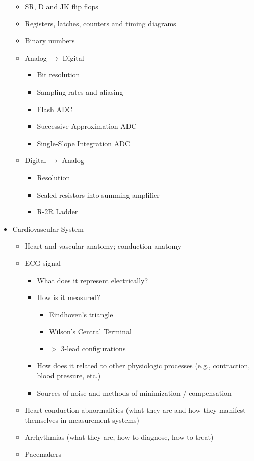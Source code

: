 \documentclass[10pt]{report}
\begin{document}
\begin{itemize}
\begin{itemize}
    \item SR, D and JK flip flops
    \item Registers, latches, counters and timing diagrams
    \item Binary numbers
    \item Analog $\rightarrow$ Digital
    \begin{itemize}
        \item Bit resolution
        \item Sampling rates and aliasing
        \item Flash ADC
        \item Successive Approximation ADC
        \item Single-Slope Integration ADC 
    \end{itemize}
    \item Digital $\rightarrow$ Analog
    \begin{itemize}
        \item Resolution
        \item Scaled-resistors into summing amplifier
        \item R-2R Ladder
    \end{itemize}
\end{itemize}
\item Cardiovascular System
\begin{itemize}
    \item Heart and vascular anatomy; conduction anatomy
    \item ECG signal
    \begin{itemize}
        \item What does it represent electrically?
        \item How is it measured?
        \begin{itemize}
            \item Eindhoven's triangle
            \item Wilson's Central Terminal
            \item $>$ 3-lead configurations
        \end{itemize}
        \item How does it related to other physiologic processes (e.g., contraction, blood pressure, etc.)
        \item Sources of noise and methods of minimization / compensation
    \end{itemize}
    \item Heart conduction abnormalities (what they are and how they manifest themselves in measurement systems)
    \item Arrhythmias (what they are, how to diagnose, how to treat)
    \item Pacemakers
    \end{itemize}
\end{itemize}
\end{document}
